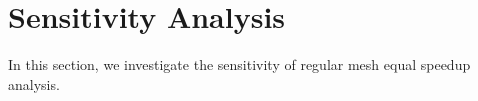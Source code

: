 \section{Sensitivity Analysis}

\vspace*{50pt}
In this section, we investigate the sensitivity of regular mesh equal speedup analysis.

\vspace*{50pt}


\vspace*{50pt}






